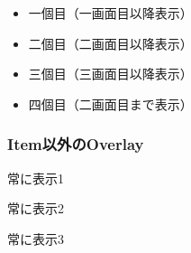 \documentclass{beamer} %
\theoremstyle{example}
\begin{document}
\begin{itemize}
  \item<1-> 一個目（一画面目以降表示）
  \item<2-> 二個目（二画面目以降表示）
  \item<3-> 三個目（三画面目以降表示）
  \item<1-2> 四個目（二画面目まで表示）
\end{itemize}

\begin{frame}
  \frametitle{Item以外のOverlay}
  \begin{block}{常に表示1}
  \end{block}
  \begin{block}{常に表示2}
  \end{block}
  \begin{block}{常に表示3}
  \end{block}
\end{frame}
\end{document}
